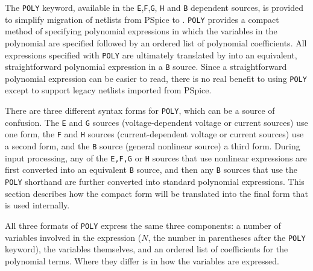 



The \texttt{POLY} keyword, available in the
\texttt{E},\texttt{F},\texttt{G}, \texttt{H} and \texttt{B} dependent
sources, is provided to simplify migration of netlists from PSpice to
\Xyce{}.  \texttt{POLY} provides a compact method of specifying
polynomial expressions in which the variables in the polynomial are
specified followed by an ordered list of polynomial coefficients.  All
expressions specified with \texttt{POLY} are ultimately translated by
\Xyce{} into an equivalent, straightforward polynomial expression in a
\texttt{B} source.  Since a straightforward polynomial expression can
be easier to read, there is no real benefit to using \texttt{POLY}
except to support legacy netlists imported from PSpice.

There are three different syntax forms for \texttt{POLY}, which can be
a source of confusion.  The \texttt{E} and \texttt{G} sources
(voltage-dependent voltage or current sources) use one form, the
\texttt{F} and \texttt{H} sources (current-dependent voltage or
current sources) use a second form, and the \texttt{B} source (general
nonlinear source) a third form.  During input processing, any of the
\texttt{E,F,G} or \texttt{H} sources that use nonlinear expressions
are first converted into an equivalent \texttt{B} source, and then any
\texttt{B} sources that use the \texttt{POLY} shorthand are further
converted into standard polynomial expressions.  This section describes
how the compact form will be translated into the final form that is
used internally.

All three formats of \texttt{POLY} express the same three components:
a number of variables involved in the expression ($N$, the number in
parentheses after the \texttt{POLY} keyword), the variables
themselves, and an ordered list of coefficients for the polynomial
terms.  Where they differ is in how the variables are expressed.


